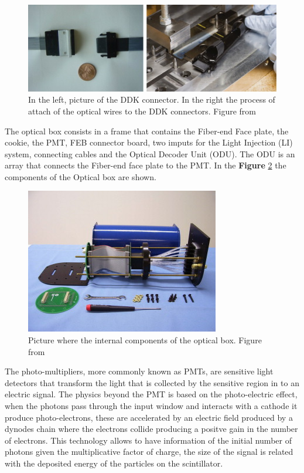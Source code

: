 \begin{figure}[!htb]
    \centering
    \includegraphics{Figures/Chapter2/OpticCablesConnectors.jpg}
    \caption{In the left, picture of the DDK connector. In the right the process of attach of the optical wires to the DDK connectors. Figure from \cite{ALIAGA2014130}}
    \label{fig:MnvExp:MnvDetector:DDKConnector}
\end{figure}

The optical box consists in a frame that contains the Fiber-end Face plate, the cookie, the PMT, FEB connector board, two imputs for the Light Injection (LI) system, connecting cables and the Optical Decoder Unit (ODU). The ODU is an array that connects the Fiber-end face plate to the PMT. In the \textbf{Figure} \ref{fig:MnvExp:MnvDetector:OpticalBox} the components of the Optical box are shown. 

\begin{figure}[!htb]
    \centering
    \includegraphics{Figures/Chapter2/OpticaBox.jpg}
    \caption{Picture where the internal components of the optical box. Figure from \cite{ALIAGA2014130}}
    \label{fig:MnvExp:MnvDetector:OpticalBox}
\end{figure}

The photo-multipliers, more commonly known as PMTs, are sensitive light detectors that transform the light that is collected by the sensitive region in to an electric signal. The physics beyond the PMT is based on the photo-electric effect, when the photons pass through the input window and interacts with a  cathode it produce photo-electrons, these are accelerated by an electric field produced by a dynodes chain where the electrons collide producing a positve gain in the number of electrons. This technology allows to have information of the initial number of photons given the multiplicative factor of charge, the size of the signal is related with the deposited energy of the particles on the scintillator. 

